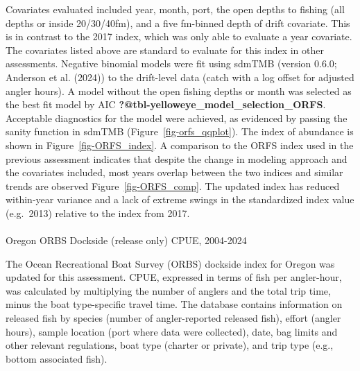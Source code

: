 \documentclass[
]{scrartcl}
\makeatletter
\let\oldparagraph\paragraph
\renewcommand{\paragraph}{
    \@ifstar
      \xxxParagraphStar
      \xxxParagraphNoStar
  }
\newcommand{\xxxParagraphStar}[1]{\oldparagraph*{#1}\mbox{}}
\newcommand{\xxxParagraphNoStar}[1]{\oldparagraph{#1}\mbox{}}
\makeatother
\begin{document}
Covariates evaluated included year, month, port, the open depths to
fishing (all depths or inside 20/30/40fm), and a five fm-binned depth of
drift covariate. This is in contrast to the 2017 index, which was only
able to evaluate a year covariate. The covariates listed above are
standard to evaluate for this index in other assessments. Negative
binomial models were fit using sdmTMB (version 0.6.0; Anderson et al.
(2024)) to the drift-level data (catch with a log offset for adjusted
angler hours). A model without the open fishing depths or month was
selected as the best fit model by AIC
\textbf{?@tbl-yelloweye\_model\_selection\_ORFS}. Acceptable diagnostics
for the model were achieved, as evidenced by passing the sanity function
in sdmTMB (Figure~\ref{fig-orfs_qqplot}). The index of abundance is
shown in Figure~\ref{fig-ORFS_index}. A comparison to the ORFS index
used in the previous assessment indicates that despite the change in
modeling approach and the covariates included, most years overlap
between the two indices and similar trends are observed
Figure~\ref{fig-ORFS_comp}. The updated index has reduced within-year
variance and a lack of extreme swings in the standardized index value
(e.g.~2013) relative to the index from 2017.

\paragraph{Oregon ORBS Dockside (release only) CPUE,
2004-2024}\label{oregon-orbs-dockside-release-only-cpue-2004-2024}

The Ocean Recreational Boat Survey (ORBS) dockside index for Oregon was
updated for this assessment. CPUE, expressed in terms of fish per
angler-hour, was calculated by multiplying the number of anglers and the
total trip time, minus the boat type-specific travel time. The database
contains information on released fish by species (number of
angler-reported released fish), effort (angler hours), sample location
(port where data were collected), date, bag limits and other relevant
regulations, boat type (charter or private), and trip type (e.g., bottom
associated fish).
\end{document}
